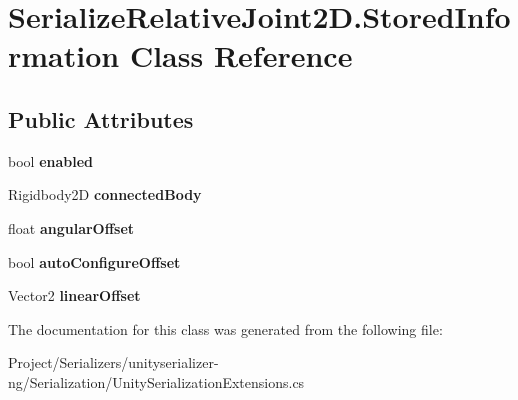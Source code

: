 \hypertarget{class_serialize_relative_joint2_d_1_1_stored_information}{}\section{Serialize\+Relative\+Joint2\+D.\+Stored\+Information Class Reference}
\label{class_serialize_relative_joint2_d_1_1_stored_information}
\subsection*{Public Attributes}
\begin{DoxyCompactItemize}
\item 
\mbox{\label{class_serialize_relative_joint2_d_1_1_stored_information_a4c6e1a2ee067b5e8efd7b7138d2ede47}} 
bool {\bfseries enabled}
\item 
\mbox{\label{class_serialize_relative_joint2_d_1_1_stored_information_a882928ad112685836396480619a83412}} 
Rigidbody2D {\bfseries connected\+Body}
\item 
\mbox{\label{class_serialize_relative_joint2_d_1_1_stored_information_ad3cd683f4c04ea46c857456599c7fe5c}} 
float {\bfseries angular\+Offset}
\item 
\mbox{\label{class_serialize_relative_joint2_d_1_1_stored_information_a1161e388d52033b3cb94a5de869d46bc}} 
bool {\bfseries auto\+Configure\+Offset}
\item 
\mbox{\label{class_serialize_relative_joint2_d_1_1_stored_information_aec22e67aa7fd628a8a7fb571659792a5}} 
Vector2 {\bfseries linear\+Offset}
\end{DoxyCompactItemize}


The documentation for this class was generated from the following file\+:\begin{DoxyCompactItemize}
\item 
Project/\+Serializers/unityserializer-\/ng/\+Serialization/Unity\+Serialization\+Extensions.\+cs\end{DoxyCompactItemize}
